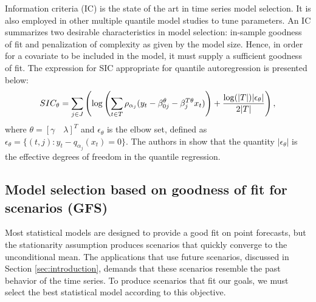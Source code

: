Information criteria (IC) is the state of the art in time series model selection. It is also employed in other multiple quantile model studies \cite{zou_regularized_2008, jiang_interquantile_2014} to tune parameters.
An IC summarizes two desirable characteristics in model selection: in-sample goodness of fit and penalization of complexity as given by the model size. Hence, in order for a covariate to be included in the model, it must supply a sufficient goodness of fit. The expression for SIC appropriate for quantile autoregression is presented below:
 \begin{equation} 
\small
SIC_\theta = \sum_{j \in J} \left( \log \left(\sum_{t \in T}\rho_{\alpha_j}(y_t - \beta_{0j}^\theta - \beta_j^{T\theta} x_t) \right) +  \frac{\log(|T|)|\epsilon_\theta|}{2|T|}  \right),\label{eq:SIC}
\end{equation}
where $\theta = [\gamma \quad \lambda]^T$ and $\epsilon_\theta$ is the elbow set, defined as $\epsilon_\theta = \{(t,j): y_t - q_{\alpha_j}(x_t) = 0 \}$. The authors in \cite{li_l1-norm_2008} show that the quantity $|\epsilon_\theta|$ is the effective degrees of freedom in the quantile regression.


\subsection{Model selection based on goodness of fit for scenarios (GFS)} \label{sec:GFS}

Most statistical models are designed to provide a good fit on point forecasts, but the stationarity assumption produces scenarios that quickly converge to the unconditional mean.
The applications that use future scenarios, discussed in Section \ref{sec:introduction}, demands that these scenarios resemble the past behavior of the time series.
To produce scenarios that fit our goals, we must select the best statistical model according to this objective. 

